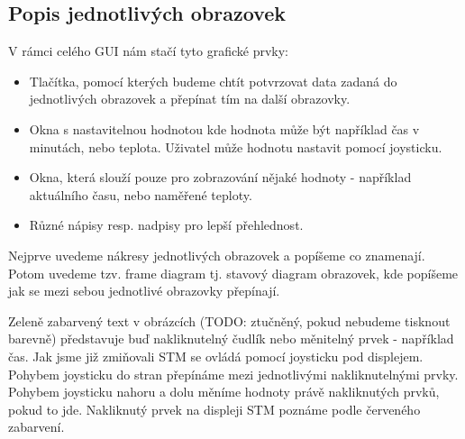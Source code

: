 \subsection{Popis jednotlivých obrazovek}

V rámci celého GUI nám stačí tyto grafické prvky:
\begin{itemize}
  \item Tlačítka, pomocí kterých budeme chtít potvrzovat data zadaná do jednotlivých obrazovek
    a přepínat tím na další obrazovky.
  \item Okna s nastavitelnou hodnotou kde hodnota může být například čas v minutách, nebo teplota.
    Uživatel může hodnotu nastavit pomocí joysticku.
  \item Okna, která slouží pouze pro zobrazování nějaké hodnoty - například aktuálního času, nebo
    naměřené teploty.
  \item Různé nápisy resp. nadpisy pro lepší přehlednost.
\end{itemize}

Nejprve uvedeme nákresy jednotlivých obrazovek a popíšeme co znamenají.
Potom uvedeme tzv. frame diagram tj. stavový diagram obrazovek, kde popíšeme jak se mezi sebou
jednotlivé obrazovky přepínají.

Zeleně zabarvený text v obrázcích (TODO: ztučněný, pokud nebudeme tisknout barevně) představuje
buď nakliknutelný čudlík nebo měnitelný prvek - například čas.
Jak jsme již zmiňovali STM se ovládá pomocí joysticku pod displejem.
Pohybem joysticku do stran přepínáme mezi jednotlivými nakliknutelnými prvky.
Pohybem joysticku nahoru a dolu měníme hodnoty právě nakliknutých prvků, pokud to jde.
Nakliknutý prvek na displeji STM poznáme podle červeného zabarvení.

